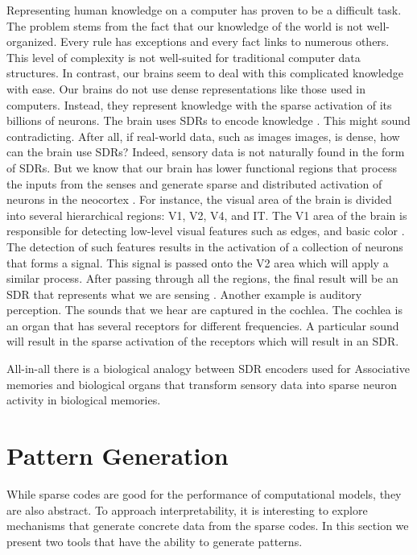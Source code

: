 \documentclass[runningheads]{llncs}
\begin{document}
Representing human knowledge on a computer has proven to be a difficult task. The problem stems from the fact that our knowledge of the world is not well-organized. Every rule has exceptions and every fact links to numerous others. This level of complexity is not well-suited for traditional computer data structures. In contrast, our brains seem to deal with this complicated knowledge with ease. Our brains do not use dense representations like those used in computers. Instead, they represent knowledge with the sparse activation of its billions of neurons. The brain uses SDRs to encode knowledge \cite{Hawkins-et-al-2016-Book}. This might sound contradicting. After all, if real-world data, such as images images, is dense, how can the brain use SDRs? Indeed, sensory data is not naturally found in the form of SDRs. But we know that our brain has lower functional regions that process the inputs from the senses and generate sparse and distributed activation of neurons in the neocortex \cite{olshausen1996emergence}. For instance, the visual area of the brain is divided into several hierarchical regions: V1, V2, V4, and IT. The V1 area of the brain is responsible for detecting low-level visual features such as edges, and basic color \cite{felleman1991distributed}. The detection of such features results in the activation of a collection of neurons that forms a signal. This signal is passed onto the V2 area which will apply a similar process. After passing through all the regions, the final result will be an SDR that represents what we are sensing \cite{hawkins2004intelligence}. Another example is auditory perception. The sounds that we hear are captured in the cochlea. The cochlea is an organ that has several receptors for different frequencies. A particular sound will result in the sparse activation of the receptors which will result in an SDR.

All-in-all there is a biological analogy between SDR encoders used for Associative memories and biological organs that transform sensory data into sparse neuron activity in biological memories.

\section{Pattern Generation}
\label{sec:gen}
While sparse codes are good for the performance of computational models, they are also abstract. To approach interpretability, it is interesting to explore mechanisms that generate concrete data from the sparse codes.
In this section we present two tools that have the ability to generate patterns.
\end{document}
